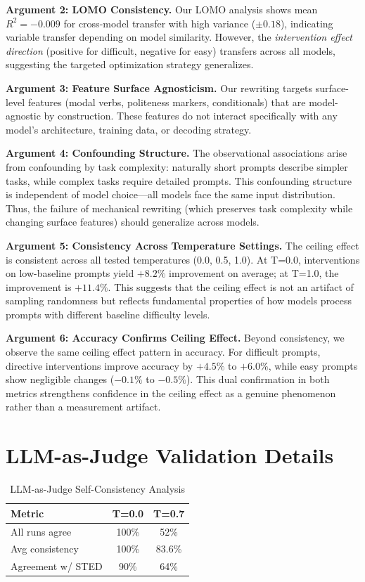 \documentclass[sigconf,anonymous,review]{acmart}
\begin{document}
\textbf{Argument 2: LOMO Consistency.} Our LOMO analysis shows mean $R^2 = -0.009$ for cross-model transfer with high variance ($\pm 0.18$), indicating variable transfer depending on model similarity. However, the \textit{intervention effect direction} (positive for difficult, negative for easy) transfers across all models, suggesting the targeted optimization strategy generalizes.

\textbf{Argument 3: Feature Surface Agnosticism.} Our rewriting targets surface-level features (modal verbs, politeness markers, conditionals) that are model-agnostic by construction. These features do not interact specifically with any model's architecture, training data, or decoding strategy.

\textbf{Argument 4: Confounding Structure.} The observational associations arise from confounding by task complexity: naturally short prompts describe simpler tasks, while complex tasks require detailed prompts. This confounding structure is independent of model choice---all models face the same input distribution. Thus, the failure of mechanical rewriting (which preserves task complexity while changing surface features) should generalize across models.

\textbf{Argument 5: Consistency Across Temperature Settings.} The ceiling effect is consistent across all tested temperatures (0.0, 0.5, 1.0). At T=0.0, interventions on low-baseline prompts yield $+8.2\%$ improvement on average; at T=1.0, the improvement is $+11.4\%$. This suggests that the ceiling effect is not an artifact of sampling randomness but reflects fundamental properties of how models process prompts with different baseline difficulty levels.

\textbf{Argument 6: Accuracy Confirms Ceiling Effect.} Beyond consistency, we observe the same ceiling effect pattern in accuracy. For difficult prompts, directive interventions improve accuracy by $+4.5\%$ to $+6.0\%$, while easy prompts show negligible changes ($-0.1\%$ to $-0.5\%$). This dual confirmation in both metrics strengthens confidence in the ceiling effect as a genuine phenomenon rather than a measurement artifact.

\section{LLM-as-Judge Validation Details}
\label{app:llm_judge}

\begin{table}[h]
\centering
\caption{LLM-as-Judge Self-Consistency Analysis}
\small
\begin{tabular}{@{}lcc@{}}
\toprule
\textbf{Metric} & \textbf{T=0.0} & \textbf{T=0.7} \\
\midrule
All runs agree & 100\% & 52\% \\
Avg consistency & 100\% & 83.6\% \\
Agreement w/ STED & 90\% & 64\% \\
\bottomrule
\end{tabular}
\end{table}
\end{document}
